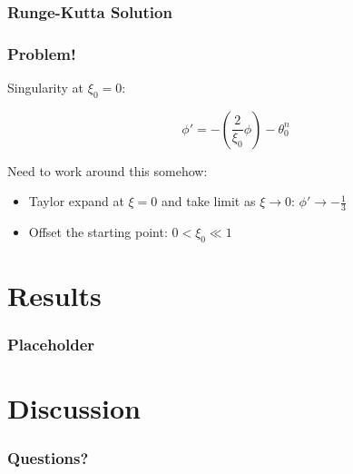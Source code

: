\documentclass{beamer}
\begin{document}
        \begin{frame}
            \frametitle{Runge-Kutta Solution}

        \end{frame}

        \begin{frame}
           \frametitle{Problem!}

            Singularity at \(\xi_0=0\):

            \[ \phi'=-\left(\frac{2}{\xi_0}\phi\right)-\theta_0^n\]

            Need to work around this somehow:
            \pause
            \begin{itemize}
                \item Taylor expand at \(\xi=0\) and take limit as \(\xi\rightarrow 0\): \(\phi'\rightarrow -\frac{1}{3}\)
                \pause
                \item Offset the starting point: \(0< \xi_0 \ll 1\)
            \end{itemize}

        \end{frame}

    \section{Results}

        \begin{frame}
            \frametitle{Placeholder}

        \end{frame}

    \section{Discussion}

        \begin{frame}
            \frametitle{Questions?}

        \end{frame}
\end{document}
